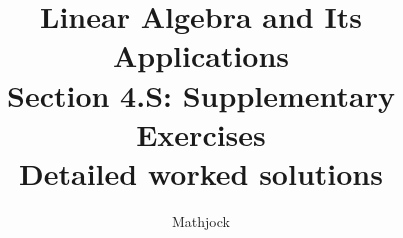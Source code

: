 
\title{\textbf{Linear Algebra and Its Applications}\\[0.3em]Section 4.S: Supplementary Exercises\\[0.3em]\large Detailed worked solutions}
\author{Mathjock}
\date{}

\maketitle
\bookinfo
\tableofcontents
\clearpage
\renewcommand{\thesection}{4.S}
\renewcommand{\theHsection}{4.S}
\setcounter{section}{0}


